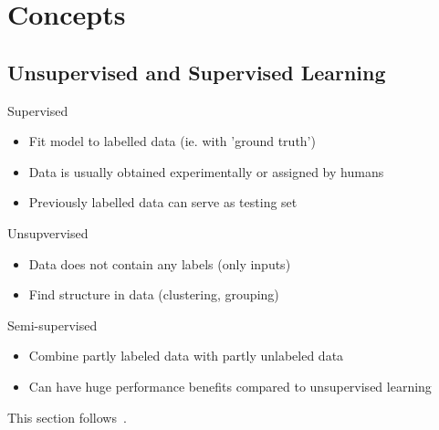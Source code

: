 \section{Concepts}
\label{sec:concepts}
\subsection{Unsupervised and Supervised Learning}
\label{subsec:concepts-un-supervised-learning}
\begin{frame}{\insertsubsection}
    Supervised
    \pause
    \begin{itemize}[<+->]
        \item Fit model to labelled data (ie. with 'ground truth')
        \item Data is usually obtained experimentally or assigned by humans
        \item Previously labelled data can serve as testing set
    \end{itemize}
    \pause
    Unsupvervised
    \pause
    \begin{itemize}[<+->]
        \item Data does not contain any labels (only inputs)
        \item Find structure in data (clustering, grouping)
    \end{itemize}
    \pause
    Semi-supervised
    \pause
    \begin{itemize}[<+->]
        \item Combine partly labeled data with partly unlabeled data
        \item Can have huge performance benefits compared to unsupervised learning
    \end{itemize}
    This section follows~\cite{Greener2021}.
\end{frame}
%
%
